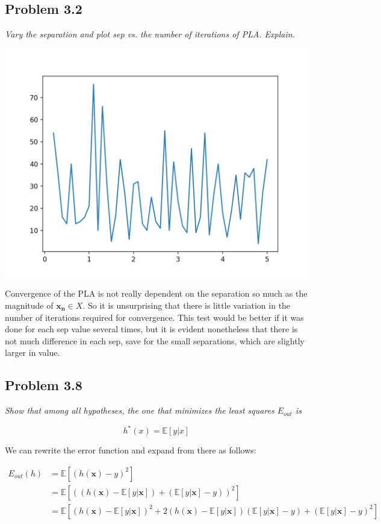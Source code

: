 \documentclass{article}
\renewcommand{\vec}[1]{\mathbf{#1}}
\begin{document}
\subsection*{Problem 3.2}

\textit{Vary the separation and plot sep vs. the number of iterations of PLA. Explain.}

\includegraphics[width=\textwidth]{32maybe2.png}

Convergence of the PLA is not really dependent on the separation so much as the magnitude of
$\vec{x_n} \in X$. So it is unsurprising that there is little variation in the number of 
iterations required for convergence. This test would be better if it was done for each sep value
several times, but it is evident nonetheless that there is not much difference in each sep, save
for the small separations, which are slightly larger in value.


\subsection*{Problem 3.8}

\textit{Show that among all hypotheses, the one that minimizes the least squares $E_{out}$ is}

$$h^*(x) = \mathbb{E}[y | x]$$

We can rewrite the error function and expand from there as follows:

\begin{align*}
  E_{out}(h) &= \mathbb{E}[(h(\vec{x}) - y)^2] \\
  &= \mathbb{E}[((h(\vec{x}) - \mathbb{E}[y|\vec{x}]) + (\mathbb{E}[y|\vec{x}] - y))^2] \\
  &= \mathbb{E}[(h(\vec{x})-\mathbb{E}[y|\vec{x}])^2 + 2(h(\vec{x}) - \mathbb{E}[y|\vec{x}])(\mathbb{E}[y|\vec{x}] - y) + (\mathbb{E}[y|\vec{x}] - y)^2] \\ 
\end{align*}
\end{document}
